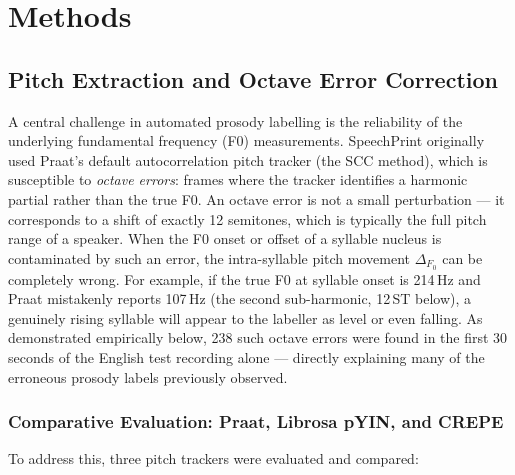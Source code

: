 
\chapter{Methods}
\label{methods}

\section{Pitch Extraction and Octave Error Correction}
\label{sec:pitch_extraction}

A central challenge in automated prosody labelling is the reliability of the
underlying fundamental frequency (F0) measurements. SpeechPrint originally used
Praat's default autocorrelation pitch tracker (the SCC method), which is
susceptible to \emph{octave errors}: frames where the tracker identifies a
harmonic partial rather than the true F0. An octave error is not a small
perturbation --- it corresponds to a shift of exactly 12 semitones, which is
typically the full pitch range of a speaker. When the F0 onset or offset of a
syllable nucleus is contaminated by such an error, the intra-syllable pitch
movement $\Delta_{F_0}$ can be completely wrong. For example, if the true F0 at
syllable onset is 214\,Hz and Praat mistakenly reports 107\,Hz (the second
sub-harmonic, 12\,ST below), a genuinely rising syllable will appear to the
labeller as level or even falling. As demonstrated empirically below, 238 such
octave errors were found in the first 30 seconds of the English test recording
alone --- directly explaining many of the erroneous prosody labels previously
observed.

\subsection{Comparative Evaluation: Praat, Librosa pYIN, and CREPE}
\label{sec:tracker_comparison}

To address this, three pitch trackers were evaluated and compared:

